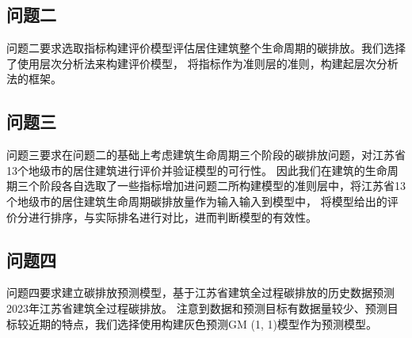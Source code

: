 \documentclass[a4paper, 12pt]{article}
\numberwithin{equation}{section}
\begin{document}
        \subsection{问题二}
            问题二要求选取指标构建评价模型评估居住建筑整个生命周期的碳排放。我们选择了使用层次分析法来构建评价模型，
            将指标作为准则层的准则，构建起层次分析法的框架。

        \subsection{问题三}
            问题三要求在问题二的基础上考虑建筑生命周期三个阶段的碳排放问题，对江苏省13个地级市的居住建筑进行评价并验证模型的可行性。
            因此我们在建筑的生命周期三个阶段各自选取了一些指标增加进问题二所构建模型的准则层中，将江苏省13个地级市的居住建筑生命周期碳排放量作为输入输入到模型中，
            将模型给出的评价分进行排序，与实际排名进行对比，进而判断模型的有效性。

        \subsection{问题四}
            问题四要求建立碳排放预测模型，基于江苏省建筑全过程碳排放的历史数据预测2023年江苏省建筑全过程碳排放。
            注意到数据和预测目标有数据量较少、预测目标较近期的特点，我们选择使用构建灰色预测GM (1, 1)模型作为预测模型。
\end{document}
